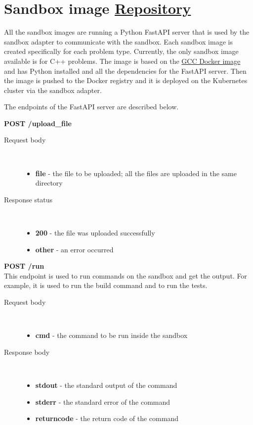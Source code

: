 \documentclass[12pt,a4paper]{report}
\begin{document}
\section{Sandbox image \href{https://github.com/acadnet-dev/sandbox-cpp}{ Repository}}
All the sandbox images are running a Python FastAPI server that is used by the sandbox adapter to communicate with the sandbox.
Each sandbox image is created specifically for each problem type. Currently, the only sandbox image available is for C++ problems.
The image is based on the \href{https://hub.docker.com/_/gcc}{GCC Docker image} and has Python installed and all the dependencies for the FastAPI server.
Then the image is pushed to the Docker registry and it is deployed on the Kubernetes cluster via the sandbox adapter.

The endpoints of the FastAPI server are described below.

\textbf{POST /upload\_file}
\begin{description}
	\item[Request body]\
		\begin{itemize}
			\item \textbf{file} - the file to be uploaded; all the files are uploaded in the same directory
		\end{itemize}
	\item[Response status]\
		\begin{itemize}
			\item \textbf{200} - the file was uploaded successfully
			\item \textbf{other} - an error occurred
		\end{itemize}
\end{description}


\textbf{POST /run}\\
This endpoint is used to run commands on the sandbox and get the output. For example, it is used to run the build command and to run the tests.
\begin{description}
	\item[Request body]\
		\begin{itemize}
			\item \textbf{cmd} - the command to be run inside the sandbox
		\end{itemize}
	\item[Response body]\
		\begin{itemize}
			\item \textbf{stdout} - the standard output of the command
			\item \textbf{stderr} - the standard error of the command
			\item \textbf{returncode} - the return code of the command
		\end{itemize}
\end{description}
\end{document}
